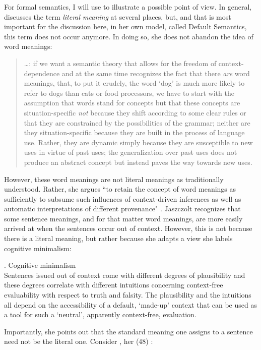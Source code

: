 For formal semantics, I will use \citet{Jaszczolt:2016} to illustrate
a possible point of view. In general, \citet{Jaszczolt:2016} discusses
the term \textit{literal meaning} at several places, but, and that is most
important for the discussion here, in her own model, called Default
Semantics, this term does not occur anymore. In doing so, she does not
abandon the idea of word meanings:
\begin{quotation}
\dots: if we want a semantic theory that
  allows for the freedom of context-dependence and at the same time
  recognizes the fact that there \emph{are} word meanings, that, to
  put it crudely, the word `dog' is much more likely to refer to dogs
  than cats or food processors, we have to start with the assumption
  that words stand for concepts but that these concepts are
  situation-specific \emph{not} because they shift according to some
  clear rules or that they are constrained by the possibilities of the
  grammar; neither are they situation-specific because they are built
  in the process of language use. Rather, they are dynamic simply
  because they are susceptible to new uses in virtue of past uses; the
  generalization over past uses does not produce an abstract concept
  but instead paves the way towards new uses.\\ \citep[133--134]{Jaszczolt:2016}  
\end{quotation}
However, these word meanings are not
literal meanings as traditionally understood. Rather, she argues
``to retain the concept of word meanings as sufficiently to subsume such
influences of context-driven inferences as well as automatic
interpretations of different provenance" %
\citep[136]{Jaszczolt:2016}. Jaszczolt recognizes that some sentence
meanings, and for that matter word meanings, are more easily arrived
at when the sentences occur out of context. However, this is not
because there is a literal meaning, but rather because she adapts a
view she labels cognitive minimalism:

\ex. Cognitive minimalism\\
Sentences issued out of context come with different degrees of
plausibility and these degrees correlate with different intuitions
concerning context-free evaluability with respect to truth and
falsity. The plausibility and the intuitions all depend on the
accessibility of a default, `made-up' context that can be used as a
tool for such a `neutral', apparently context-free, evaluation. \citep[58]{Jaszczolt:2016}

Importantly, she points out that the standard meaning one assigns to
a sentence need not be the literal one. Consider \Next, her (48)
\citep[59]{Jaszczolt:2016}:

